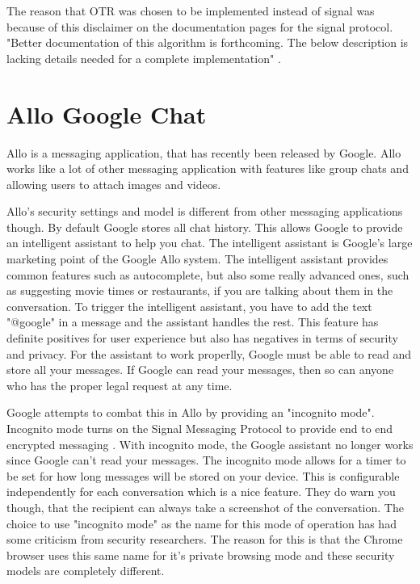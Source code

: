 The reason that OTR was chosen to be implemented instead of signal was because of this disclaimer on the documentation pages for the signal protocol. "Better documentation of this algorithm is forthcoming. The below description is lacking details needed for a complete implementation" \cite{whisper-protocol}.


\section{Allo Google Chat}


Allo is a messaging application, that has recently been released by Google. Allo works like a lot of other messaging application with features like group chats and allowing users to attach images and videos. 


Allo's security settings and model is different from other messaging applications though. By default Google stores all chat history. This allows Google to provide an intelligent assistant to help you chat. The intelligent assistant is Google's large marketing point of the Google Allo system. The intelligent assistant provides common features such as autocomplete, but also some really advanced ones, such as suggesting movie times or restaurants, if you are talking about them in the conversation. To trigger the intelligent assistant, you have to add the text "@google" in a message and the assistant handles the rest. This feature has definite positives for user experience but also has negatives in terms of security and privacy. For the assistant to work properlly, Google must be able to read and store all your messages. If Google can read your messages, then so can anyone who has the proper legal request at any time.


Google attempts to combat this in Allo by providing an "incognito mode". Incognito mode turns on the Signal Messaging Protocol to provide end to end encrypted messaging \cite{whisper-allo}. With incognito mode, the Google assistant no longer works since Google can't read your messages. The incognito mode allows for a timer to be set for how long messages will be stored on your device. This is configurable independently for each conversation which is a nice feature. They do warn you though, that the recipient can always take a screenshot of the conversation. The choice to use "incognito mode" as the name for this mode of operation has had some criticism from security researchers. The reason for this is that the Chrome browser uses this same name for it's private browsing mode and these security models are completely different. 


